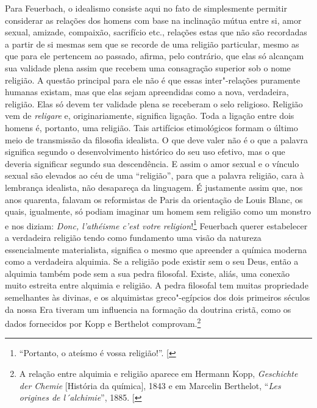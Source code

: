 Para Feuerbach, o idealismo consiste aqui no fato de simplesmente
permitir considerar as relações dos homens com base na inclinação mútua
entre si, amor sexual, amizade, compaixão, sacrifício etc., relações
estas que não são recordadas a partir de si mesmas sem que se recorde de
uma religião particular, mesmo as que para ele pertencem ao passado,
afirma, pelo contrário, que elas só alcançam sua validade plena assim
que recebem uma consagração superior sob o nome religião. A questão
principal para ele não é que essas inter"-relações puramente humanas
existam, mas que elas sejam apreendidas como a nova, verdadeira,
religião. Elas só devem ter validade plena se receberam o selo
religioso. Religião vem
de \emph{religare} e, originariamente,
significa ligação. Toda a ligação entre dois homens é, portanto, uma
religião. Tais artifícios etimológicos formam o último meio de
transmissão da filosofia idealista. O que deve valer não é o que a
palavra significa segundo o desenvolvimento histórico do seu uso
efetivo, mas o que deveria significar segundo sua descendência. E assim
o amor sexual e o vínculo sexual são elevados ao céu de uma
``religião'', para que a palavra religião, cara à lembrança idealista,
não desapareça da linguagem. É justamente assim que, nos anos quarenta,
falavam os reformistas de Paris da orientação de Louis Blanc, os quais,
igualmente, só podiam imaginar um homem sem religião como um monstro e
nos diziam: \emph{Donc, l'athéisme c'est votre
religion}!\footnote{``Portanto,
  o ateísmo é vossa religião!''. {[}\versal{N.\,T.}{]}}
Feuerbach querer
estabelecer a verdadeira religião tendo como fundamento uma visão da
natureza essencialmente materialista, significa o mesmo que apreender a
química moderna como a verdadeira alquimia. Se a religião pode existir
sem o seu Deus, então a alquimia também pode sem a sua pedra filosofal.
Existe, aliás, uma conexão muito estreita entre alquimia e religião. A
pedra filosofal tem muitas propriedade semelhantes às divinas, e os
alquimistas greco"-egípcios dos dois primeiros séculos da nossa Era
tiveram um influencia na formação da doutrina cristã, como os dados
fornecidos por Kopp e Berthelot comprovam.\footnote{A relação
  entre alquimia e religião aparece em Hermann Kopp, \emph{Geschichte
  der Chemie} {[}História da química{]}, 1843 e em Marcelin Berthelot,
  ``\emph{Les origines de l´alchimie}'', 1885. {[}\versal{N.\,T.}{]}}

